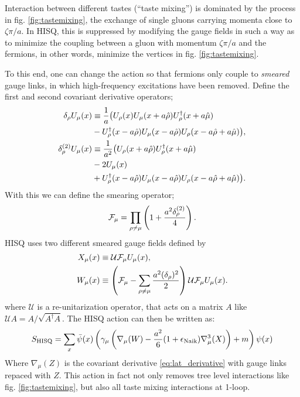     Interaction between different tastes (``taste mixing'') is dominated by the process in fig. \ref{fig:tastemixing}, the exchange of single gluons carrying momenta close to $\zeta \pi/a$. In HISQ, this is suppressed by modifying the gauge fields in such a way as to minimize the coupling between a gluon with momentum ${\zeta\pi/a}$ and the fermions, in other words, minimize the vertices in fig. \ref{fig:tastemixing}.

    To this end, one can change the action so that fermions only couple to {\textit{smeared}} gauge links, in which high-frequency excitations have been removed. Define the first and second covariant derivative operators;
    \begin{align}
      \nonumber
      \delta_{\rho}U_{\mu}(x) & \equiv {1\over a} \big( U_{\rho} (x) U_{\mu} (x + a\hat{\rho}) U_{\rho}^{\dagger}(x+a\hat{\mu}) \\
      & - U_{\rho}^{\dagger}(x-a\hat{\rho})U_{\mu}(x-a\hat{\rho})U_{\rho}(x-a\hat{\rho}+a\hat{\mu})\big),  \\
      \nonumber
      \delta_{\rho}^{(2)} U_{\mu}(x) & \equiv {1\over a^2} \big( U_{\rho}(x+a\hat{\rho})U^{\dagger}_{\rho}(x+a\hat{\mu}) \\
      \nonumber
      & - 2U_{\mu}(x) \\
      & + U_{\rho}^{\dagger}(x-a\hat{\rho})U_{\mu}(x-a\hat{\rho})U_{\rho}(x - a\hat{\rho} + a\hat{\mu}) \big).
    \end{align}
    With this we can define the smearing operator;
    \begin{align}
      \mathcal{F}_{\mu} = \prod_{\rho\neq\mu} \left( 1 + {a^2 \delta^{(2)}_{\rho}\over 4} \right).
    \end{align}
    HISQ uses two different smeared gauge fields defined by
    \begin{align}
      X_{\mu}(x) &\equiv \mathcal{U} \mathcal{F}_{\mu} U_{\mu}(x), \\
      W_{\mu}(x) &\equiv \left(\mathcal{F}_{\mu} - \sum_{\rho\neq\mu}{a^2(\delta_{\rho})^2\over 2} \right) \mathcal{U} \mathcal{F}_{\mu} U_{\mu}(x).
      \label{eq:gaugesmearing}
    \end{align}
    where $\mathcal{U}$ is a re-unitarization operator, that acts on a matrix $A$ like $\mathcal{U}A = A/\sqrt{A^{\dagger}A}$. The HISQ action can then be written as:
    \begin{align}
      S_{\text{HISQ}} = \sum_{x} \bar{\psi}(x) \left( \gamma_{\mu} \left( \nabla_{\mu}(W) - {a^2\over 6}(1+\epsilon_{\text{Naik}})\nabla^3_{\mu}(X) \right) + m \right) \psi(x)
    \end{align}
    Where $\nabla_{\mu}(Z)$ is the covariant derivative \eqref{eq:lat_derivative} with gauge links repaced with $Z$. This action in fact not only removes tree level interactions like fig. \ref{fig:tastemixing}, but also all taste mixing interactions at 1-loop.

